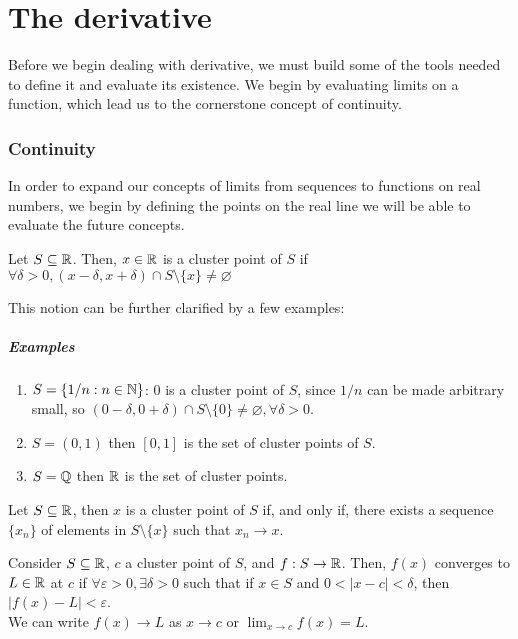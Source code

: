 \chapter{The derivative}

Before we begin dealing with derivative, we must build some of the tools needed to define it and evaluate its existence. We begin by evaluating limits on a function, which lead us to the cornerstone concept of continuity. 

\subsection{Continuity}

In order to expand our concepts of limits from sequences to functions on real numbers, we begin by defining the points on the real line we will be able to evaluate the future concepts.

\begin{definition}
    Let $S \subseteq \mathbb{R}$. Then, $x \in \mathbb{R}$ is a cluster point of $S$ if $\forall \delta > 0, (x-\delta, x+ \delta) \cap S \setminus\{x\} \neq \varnothing$
\end{definition}

This notion can be further clarified by a few examples:
\paragraph{Examples}
\begin{enumerate}
    \item $S = \{1/n: n \in \mathbb{N}\}$: $0$ is a cluster point of $S$, since $1/n$ can be made arbitrary small, so $ (0 - \delta, 0 + \delta) \cap S \setminus \{0\} \neq \varnothing, \forall \delta > 0$.
    \item $S = (0,1)$ then $[0,1]$ is the set of cluster points of $S$.
    \item $S = \mathbb{Q}$ then $\mathbb{R}$ is the set of cluster points.
\end{enumerate}

\begin{theorem}
    Let $S \subseteq \mathbb{R}$, then $x$ is a cluster point of $S$ if, and only if, there exists a sequence $\{x_n\}$ of elements in $S \setminus \{x\}$ such that $x_n \to x$.
\end{theorem}

\begin{definition}
    Consider $S \subseteq \mathbb{R}$, $c$ a cluster point of $S$, and $f: S \to \mathbb{R}$. Then, $f(x)$ converges to $L \in \mathbb{R}$ at $c$ if $\forall \varepsilon > 0, \exists \delta > 0$ such that if $x \in S$ and $0 < |x-c| < \delta$, then $|f(x) - L| < \varepsilon$. \\
    We can write $f(x) \to L$ as $x \to c$ or $\lim_{x \to c} f(x) = L$.
\end{definition}

